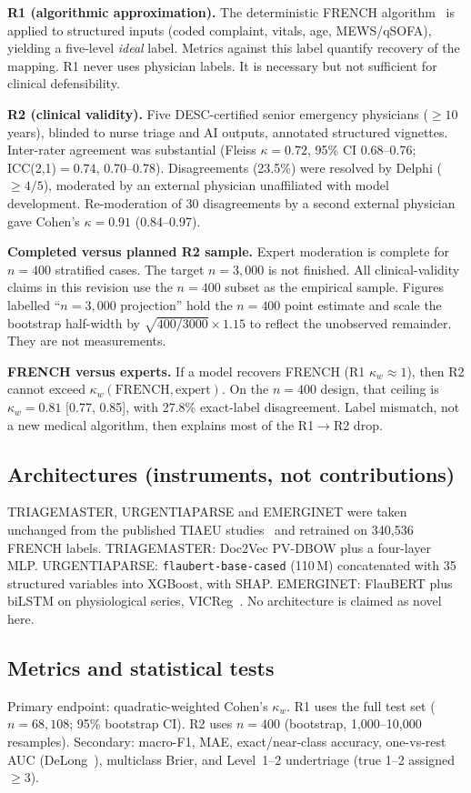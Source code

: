 \documentclass[conference]{IEEEtran}
\begin{document}
\textbf{R1 (algorithmic approximation).} The deterministic FRENCH algorithm~\cite{taboulet2019} is applied to structured inputs (coded complaint, vitals, age, MEWS/qSOFA), yielding a five-level \emph{ideal} label. Metrics against this label quantify recovery of the mapping. R1 never uses physician labels. It is necessary but not sufficient for clinical defensibility.

\textbf{R2 (clinical validity).} Five DESC-certified senior emergency physicians ($\geq10$ years), blinded to nurse triage and AI outputs, annotated structured vignettes. Inter-rater agreement was substantial (Fleiss $\kappa=0.72$, 95\% CI 0.68--0.76; ICC(2,1)$=0.74$, 0.70--0.78). Disagreements (23.5\%) were resolved by Delphi ($\geq4/5$), moderated by an external physician unaffiliated with model development. Re-moderation of 30 disagreements by a second external physician gave Cohen's $\kappa=0.91$ (0.84--0.97).

\textbf{Completed versus planned R2 sample.} Expert moderation is complete for $n=400$ stratified cases. The target $n=3{,}000$ is not finished. All clinical-validity claims in this revision use the $n=400$ subset as the empirical sample. Figures labelled ``$n=3{,}000$ projection'' hold the $n=400$ point estimate and scale the bootstrap half-width by $\sqrt{400/3000}\times1.15$ to reflect the unobserved remainder. They are not measurements.

\textbf{FRENCH versus experts.} If a model recovers FRENCH (R1 $\kappa_w\approx1$), then R2 cannot exceed $\kappa_w(\mathrm{FRENCH},\mathrm{expert})$. On the $n=400$ design, that ceiling is $\kappa_w=0.81$ [0.77, 0.85], with 27.8\% exact-label disagreement. Label mismatch, not a new medical algorithm, then explains most of the R1$\to$R2 drop.

\subsection{Architectures (instruments, not contributions)}
TRIAGEMASTER, URGENTIAPARSE and EMERGINET were taken unchanged from the published TIAEU studies~\cite{lansiaux2025bdcat,lansiaux2026jmir} and retrained on 340,536 FRENCH labels. TRIAGEMASTER: Doc2Vec PV-DBOW plus a four-layer MLP. URGENTIAPARSE: \texttt{flaubert-base-cased} (110\,M) concatenated with 35 structured variables into XGBoost, with SHAP. EMERGINET: FlauBERT plus biLSTM on physiological series, VICReg~\cite{bardes2022}. No architecture is claimed as novel here.

\subsection{Metrics and statistical tests}
Primary endpoint: quadratic-weighted Cohen's $\kappa_w$. R1 uses the full test set ($n=68{,}108$; 95\% bootstrap CI). R2 uses $n=400$ (bootstrap, 1{,}000--10{,}000 resamples). Secondary: macro-F1, MAE, exact/near-class accuracy, one-vs-rest AUC (DeLong~\cite{delong1988}), multiclass Brier, and Level~1--2 undertriage (true 1--2 assigned $\geq3$).
\end{document}
